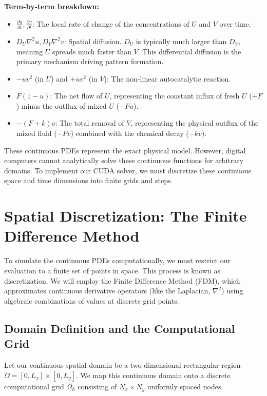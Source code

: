 \documentclass[12pt,a4paper]{article}
\begin{document}
\textbf{Term-by-term breakdown:}
\begin{itemize}
    \item $\frac{\partial u}{\partial t}, \frac{\partial v}{\partial t}$: The local rate of change of the concentrations of $U$ and $V$ over time.
    \item $D_U \nabla^2 u, D_V \nabla^2 v$: Spatial diffusion. $D_U$ is typically much larger than $D_V$, meaning $U$ spreads much faster than $V$. This differential diffusion is the primary mechanism driving pattern formation.
    \item $- u v^2$ (in $U$) and $+ u v^2$ (in $V$): The non-linear autocatalytic reaction.
    \item $F(1 - u)$: The net flow of $U$, representing the constant influx of fresh $U$ ($+F$) minus the outflux of mixed $U$ ($-Fu$).
    \item $-(F + k)v$: The total removal of $V$, representing the physical outflux of the mixed fluid ($-Fv$) combined with the chemical decay ($-kv$).
\end{itemize}

These continuous PDEs represent the exact physical model. However, digital computers cannot analytically solve these continuous functions for arbitrary domains. To implement our CUDA solver, we must discretize these continuous space and time dimensions into finite grids and steps.

\section{Spatial Discretization: The Finite Difference Method}

To simulate the continuous PDEs computationally, we must restrict our evaluation to a finite set of points in space. This process is known as discretization. We will employ the Finite Difference Method (FDM), which approximates continuous derivative operators (like the Laplacian, $\nabla^2$) using algebraic combinations of values at discrete grid points.

\subsection{Domain Definition and the Computational Grid}
Let our continuous spatial domain be a two-dimensional rectangular region $\Omega = [0, L_x] \times [0, L_y]$. We map this continuous domain onto a discrete computational grid $\Omega_h$ consisting of $N_x \times N_y$ uniformly spaced nodes. 
\end{document}
